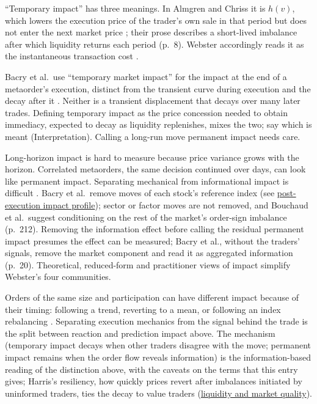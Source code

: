 \begin{qfdefinition}
 ``Temporary impact'' has three meanings. In Almgren and Chriss it is $h(v)$, which lowers the execution price of the trader's own sale in that period but does not enter the next market price \citep[author preprint of Dec.\ 2000, sec.~1.3, eq.~(2), p.~9]{alpha-almgren}; their prose describes a short-lived imbalance after which liquidity returns each period (p.~8). Webster accordingly reads it as the instantaneous transaction cost \citep[chap.~2, n.~3, p.~53]{wide-webster-price-impact}.

Bacry et al.\ use ``temporary market impact'' for the impact at the end of a metaorder's execution, distinct from the transient curve during execution and the decay after it \citep[arXiv preprint of 9 Dec.\ 2014, sec.~2.2, p.~3]{wide-bacry-life-cycle}. Neither is a transient displacement that decays over many later trades. Defining temporary impact as the price concession needed to obtain immediacy, expected to decay as liquidity replenishes, mixes the two; say which is meant (Interpretation). Calling a long-run move permanent impact needs care.

Long-horizon impact is hard to measure because price variance grows with the horizon. Correlated metaorders, the same decision continued over days, can look like permanent impact. Separating mechanical from informational impact is difficult \citep[chap.~12, sec.~12.4, p.~240]{catalogue-0528}. Bacry et al.\ remove moves of each stock's reference index (see \hyperref[meth:post-execution-impact-profile]{post-execution impact profile}); sector or factor moves are not removed, and Bouchaud et al.\ suggest conditioning on the rest of the market's order-sign imbalance (p.~212). Removing the information effect before calling the residual permanent impact presumes the effect can be measured; Bacry et al., without the traders' signals, remove the market component and read it as aggregated information (p.~20). Theoretical, reduced-form and practitioner views of impact simplify Webster's four communities.

Orders of the same size and participation can have different impact because of their timing: following a trend, reverting to a mean, or following an index rebalancing \citep[chap.~3, sec.~3.2, p.~204]{alpha-laruelle}. Separating execution mechanics from the signal behind the trade is the split between reaction and prediction impact above. The mechanism (temporary impact decays when other traders disagree with the move; permanent impact remains when the order flow reveals information) is the information-based reading of the distinction above, with the caveats on the terms that this entry gives; Harris's resiliency, how quickly prices revert after imbalances initiated by uninformed traders, ties the decay to value traders \citep[chap.~``Liquidity'', sec.~19.2, p.~400; sec.~19.3.4, p.~403]{alpha-harris} (\hyperref[def:liquidity-dimensions]{liquidity and market quality}).


\end{qfdefinition}
